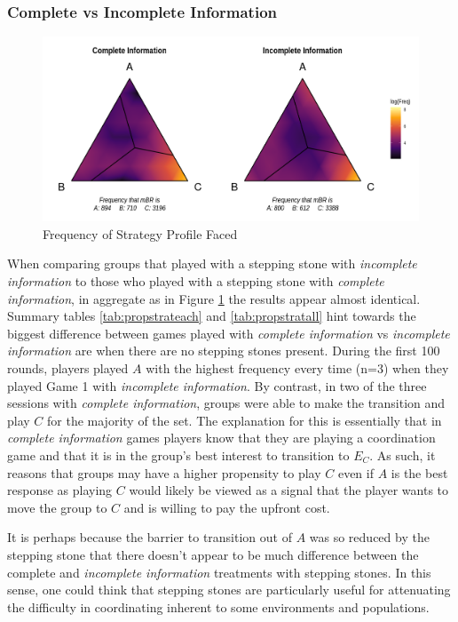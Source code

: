 \subsubsection*{Complete vs Incomplete Information}

\begin{figure}[h]
\captionsetup{justification=centering}
  \caption[caption]{Frequency of Strategy Profile Faced}
   \label{fig:GamesCIFreqPlot}
    \includegraphics[width = \textwidth]{Images/GamesCIFreqPlot.png}
\end{figure}

When comparing groups that played with a stepping stone with \textit{incomplete information} to those who played with a stepping stone with \textit{complete information}, in aggregate as in Figure \ref{fig:GamesCIFreqPlot} the results appear almost identical. Summary tables \ref{tab:propstrateach} and \ref{tab:propstratall} hint towards the biggest difference between games played with \textit{complete information} vs \textit{incomplete information} are when there are no stepping stones present. During the first 100 rounds, players played $A$ with the highest frequency every time (n=3) when they played Game 1 with \textit{incomplete information}. By contrast, in two of the three sessions with \textit{complete information}, groups were able to make the transition and play $C$ for the majority of the set. The explanation for this is essentially that in \textit{complete information} games players know that they are playing a coordination game and that it is in the group's best interest to transition to $E_C$. As such, it reasons that groups may have a higher propensity to play $C$ even if $A$ is the best response as playing $C$ would likely be viewed as a signal that the player wants to move the group to $C$ and is willing to pay the upfront cost. 

It is perhaps because the barrier to transition out of $A$ was so reduced by the stepping stone that there doesn't appear to be much difference between the complete and \textit{incomplete information} treatments with stepping stones. In this sense, one could think that stepping stones are particularly useful for attenuating the difficulty in coordinating inherent to some environments and populations. 

